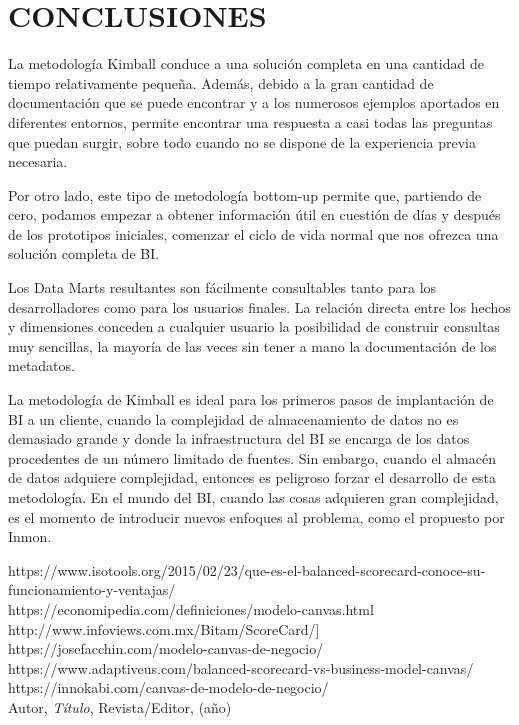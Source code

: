 \section{CONCLUSIONES}
\item{La metodología Kimball conduce a una solución completa en una cantidad de tiempo relativamente pequeña. Además, debido a la gran cantidad de documentación que se puede encontrar y a los numerosos ejemplos aportados en diferentes entornos, permite encontrar una respuesta a casi todas las preguntas que puedan surgir, sobre todo cuando no se dispone de la experiencia previa necesaria.

Por otro lado, este tipo de metodología bottom-up permite que, partiendo de cero, podamos empezar a obtener información útil en cuestión de días y después de los prototipos iniciales, comenzar el ciclo de vida normal que nos ofrezca una solución completa de BI.

Los Data Marts resultantes son fácilmente consultables tanto para los desarrolladores como para los usuarios finales. La relación directa entre los hechos y dimensiones conceden a cualquier usuario la posibilidad de construir consultas muy sencillas, la mayoría de las veces sin tener a mano la documentación de los metadatos.

La metodología de Kimball es ideal para los primeros pasos de implantación de BI a un cliente, cuando la complejidad de almacenamiento de datos no es demasiado grande y donde la infraestructura del BI se encarga de los datos procedentes de un número limitado de fuentes. Sin embargo, cuando el almacén de datos adquiere complejidad, entonces es peligroso forzar el desarrollo de esta metodología. En el mundo del BI, cuando las cosas adquieren gran complejidad, es el momento de introducir nuevos enfoques al problema, como el propuesto por Inmon.
}
\newpage
\begin{thebibliography}{99}
https://www.isotools.org/2015/02/23/que-es-el-balanced-scorecard-conoce-su-funcionamiento-y-ventajas/\\
https://economipedia.com/definiciones/modelo-canvas.html\\
http://www.infoviews.com.mx/Bitam/ScoreCard/]\\
https://josefacchin.com/modelo-canvas-de-negocio/\\
https://www.adaptiveus.com/balanced-scorecard-vs-business-model-canvas/\\
https://innokabi.com/canvas-de-modelo-de-negocio/\\


 Autor, \emph{Título}, Revista/Editor, (año)

\end{thebibliography}



